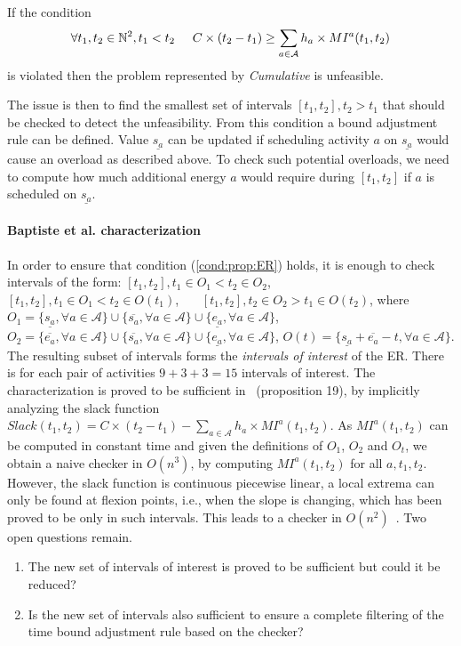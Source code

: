 \documentclass{llncs}
\newcommand \MI[3]{MI^{#3}(#1,#2) }
\newcommand \SL[2]{Slack(#1,#2) }
\begin{document}
 \begin{proposition}\label{prop:ER}
 If the condition 
 \begin{eqnarray}
 \forall t_1,t_2 \in \mathbb{N}^2,t_1<t_2 \hspace{.5cm} C\times(t_2-t_1) \geq \sum \limits_{a \in \mathcal{A}} h_a \times   \MI{t_1}{t_2}{a}\label{cond:prop:ER}
 \end{eqnarray} 
 is violated then the problem represented by \emph{Cumulative} is unfeasible.
 \end{proposition}
The issue is then to find the smallest set of intervals $[t_1,t_2], t_2 > t_1$ that should be checked to detect the unfeasibility.
From this condition a bound adjustment rule can be defined.
Value $\underline{s_a}$ can be updated if scheduling activity $a$ on $\underline{s_a}$ would cause an overload as described above.
To check such potential overloads, we need to compute how much additional energy $a$  would require during $[t_1,t_2]$ if $a$ is scheduled on $\underline{s_a}$.


\paragraph{\bf Baptiste et al. characterization}  
In order to ensure that condition (\ref{cond:prop:ER}) holds, it is enough to check intervals of the form: 
    $[t_1,t_2], t_1 \in O_1 < t_2 \in O_2$,~~~
    $[t_1,t_2], t_1 \in O_1 < t_2 \in O(t_1)$,~~~
    $[t_1,t_2], t_2 \in O_2 > t_1 \in O(t_2)$,
where
$O_1 = \{\underline{s_a}, \forall a \in\mathcal{A}\}    \cup   \{\overline{s_a}, \forall a \in\mathcal{A}\}   \cup   \{\underline{e_a}, \forall a \in\mathcal{A}\} $, 
$O_2 = \{\overline{e_a}, \forall a \in\mathcal{A}\}    \cup   \{\overline{s_a}, \forall a \in\mathcal{A}\}   \cup   \{\underline{e_a}, \forall a \in\mathcal{A}\}  $,
$O(t)  = \{\underline{s_a} + \overline{e_a} - t, \forall a \in\mathcal{A}\} $.
The resulting subset of intervals forms the \emph{intervals of interest} of the ER. 
There is for each pair of activities $9\!+\!3\!+\!3\!=\!15$  intervals of interest. 
The characterization is proved to be sufficient in~\cite{baptiste:inria-00123562} (proposition 19), by implicitly analyzing the slack function
 $\SL{t_1}{t_2} = C\times(t_2-t_1) - \sum_{a \in \mathcal{A}} h_a \times   \MI{t_1}{t_2}{a}$.
As $\MI{t_1}{t_2}{a}$ can be computed in constant time and given the definitions of $O_1$, $O_2$ and $O_t$, we obtain a naive checker in $O(n^3)$, by computing $\MI{t_1}{t_2}{a}$ for all $a,t_1,t_2$. 
However, the slack function is continuous piecewise linear, a local extrema can only be found at flexion points,  i.e., when the slope is changing, which has been proved to be only in such intervals. 
This leads to a checker in $O(n^2)$~\cite{baptiste:inria-00123562}.
Two open questions remain.
\begin{enumerate}
\item The new set of intervals of interest is proved to be sufficient but could it be reduced?
\item Is the new set of intervals also sufficient to ensure a complete filtering of the time bound adjustment rule based on the checker? 
\end{enumerate}
\end{document}

